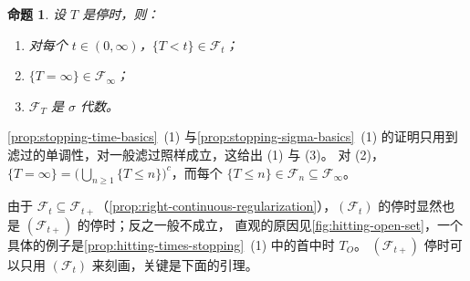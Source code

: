 \documentclass[UTF8,11pt,a4paper,oneside,fontset=fandol]{ctexrep}
\makeatletter
\numberwithin{equation}{section}
\theoremstyle{zhthm}
\newtheorem{proposition}[theorem]{命题}
\renewenvironment{proof}[1][\proofname]{\par
  \pushQED{\qed}%
  \normalfont\topsep6\p@\@plus6\p@\relax
  \trivlist
  \item[\hskip\labelsep\bfseries#1\hspace{0.5em}]\ignorespaces
}{%
  \popQED\endtrivlist\@endpefalse
}
\renewcommand{\proofname}{证明}
\newcommand{\F}{\mathcal{F}}
\makeatother
\begin{document}
\begin{proposition}
\label{prop:stopping-time-general-basics}
设 $T$ 是停时，则：
\begin{enumerate}[label=(\arabic*)]
  \item 对每个 $t\in(0,\infty)$，$\{T<t\}\in\F_t$；
  \item $\{T=\infty\}\in\F_\infty$；
  \item $\F_T$ 是 $\sigma$ 代数。
\end{enumerate}
\end{proposition}

\begin{proof}
\cref{prop:stopping-time-basics}~(1) 与\cref{prop:stopping-sigma-basics}~(1) 的证明只用到滤过的单调性，对一般滤过照样成立，这给出 (1) 与 (3)。
对 (2)，$\{T=\infty\}=\bigl(\bigcup_{n\ge1}\{T\le n\}\bigr)^c$，而每个 $\{T\le n\}\in\F_n\subseteq\F_\infty$。
\end{proof}

由于 $\F_t\subseteq\F_{t+}$（\cref{prop:right-continuous-regularization}），$(\F_t)$ 的停时显然也是 $(\F_{t+})$ 的停时；反之一般不成立，
直观的原因见\cref{fig:hitting-open-set}，一个具体的例子是\cref{prop:hitting-times-stopping}~(1) 中的首中时 $T_O$。
$(\F_{t+})$ 停时可以只用 $(\F_t)$ 来刻画，关键是下面的引理。
\end{document}
